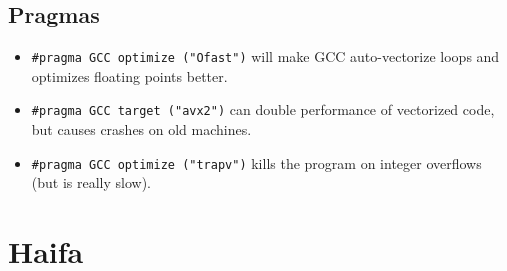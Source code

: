 	\subsection{Pragmas}
		\begin{itemize}
			\item \lstinline{#pragma GCC optimize ("Ofast")} will make GCC auto-vectorize loops and optimizes floating points better.
			\item \lstinline{#pragma GCC target ("avx2")} can double performance of vectorized code, but causes crashes on old machines.
			\item \lstinline{#pragma GCC optimize ("trapv")} kills the program on integer overflows (but is really slow).
		\end{itemize}

\section{Haifa}
